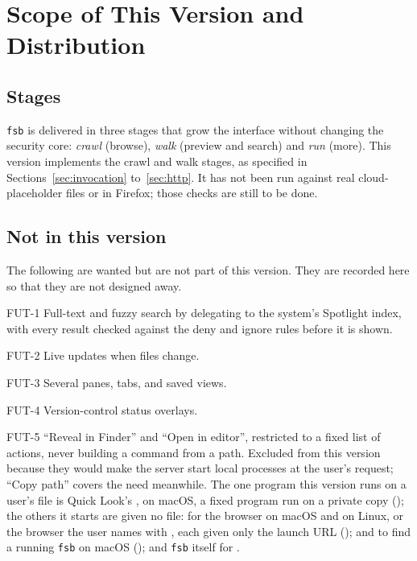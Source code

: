 \section{Scope of This Version and Distribution}

\subsection{Stages}

\texttt{fsb} is delivered in three stages that grow the interface without changing
the security core: \emph{crawl} (browse), \emph{walk} (preview and search) and
\emph{run} (more).  This version implements the crawl and walk stages, as specified
in Sections~\ref{sec:invocation} to~\ref{sec:http}.  It has not been run against real
cloud-placeholder files or in Firefox; those checks are still to be done.

\subsection{Not in this version}

The following are wanted but are not part of this version.  They are recorded here so
that they are not designed away.

\begin{req}{FUT-1}
Full-text and fuzzy search by delegating to the system's Spotlight index, with every
result checked against the deny and ignore rules before it is shown.
\end{req}

\begin{req}{FUT-2}
Live updates when files change.
\end{req}

\begin{req}{FUT-3}
Several panes, tabs, and saved views.
\end{req}

\begin{req}{FUT-4}
Version-control status overlays.
\end{req}

\begin{req}{FUT-5}
``Reveal in Finder'' and ``Open in editor'', restricted to a fixed list of actions,
never building a command from a path.  Excluded from this version because they would
make the server start local processes at the user's request; ``Copy path'' covers the
need meanwhile.  The one program this version runs on a user's file is Quick Look's
, on macOS, a fixed program run on a private copy (); the
others it starts are given no file:  for the browser on macOS and
 on Linux, or the browser the user names with , each
given only the launch URL ();  and  to find a running
\texttt{fsb} on macOS (); and \texttt{fsb} itself for
.
\end{req}

